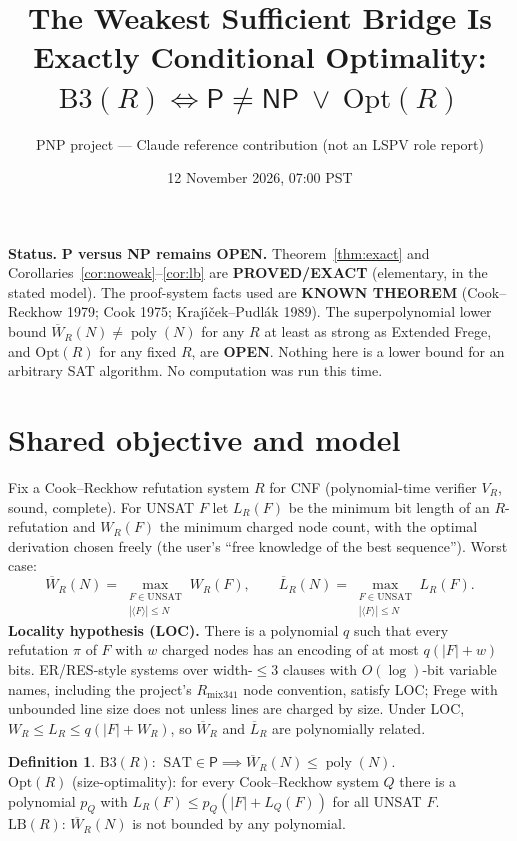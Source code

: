 \documentclass[11pt]{article}
\title{The Weakest Sufficient Bridge Is Exactly Conditional Optimality:\\
$\mathrm{B3}(R)\iff \mathsf P\neq\mathsf{NP}\ \lor\ \mathrm{Opt}(R)$}
\author{PNP project --- Claude reference contribution (not an LSPV role report)}
\date{12 November 2026, 07:00 PST}
\theoremstyle{definition}\newtheorem{definition}[theorem]{Definition}
\newcommand{\poly}{\operatorname{poly}}
\begin{document}
\maketitle

\noindent\textbf{Status.} \textbf{P versus NP remains OPEN.}
Theorem~\ref{thm:exact} and Corollaries~\ref{cor:noweak}--\ref{cor:lb} are
\textbf{PROVED/EXACT} (elementary, in the stated model). The proof-system facts
used are \textbf{KNOWN THEOREM} (Cook--Reckhow 1979; Cook 1975; Kraj\'{\i}\v{c}ek--Pudl\'ak 1989).
The superpolynomial lower bound $\overline W_R(N)\neq\poly(N)$ for any $R$ at least as strong
as Extended Frege, and $\mathrm{Opt}(R)$ for any fixed $R$, are \textbf{OPEN}.
Nothing here is a lower bound for an arbitrary SAT algorithm. No computation was run this time.

\section{Shared objective and model}
Fix a Cook--Reckhow refutation system $R$ for CNF (polynomial-time verifier $V_R$, sound, complete).
For UNSAT $F$ let $L_R(F)$ be the minimum bit length of an $R$-refutation and
$W_R(F)$ the minimum charged node count, with the optimal derivation chosen freely (the user's
``free knowledge of the best sequence''). Worst case:
\[
\overline W_R(N)=\max_{\substack{F\in\mathrm{UNSAT}\\|\langle F\rangle|\le N}} W_R(F),\qquad
\overline L_R(N)=\max_{\substack{F\in\mathrm{UNSAT}\\|\langle F\rangle|\le N}} L_R(F).
\]
\textbf{Locality hypothesis (LOC).} There is a polynomial $q$ such that every refutation $\pi$ of
$F$ with $w$ charged nodes has an encoding of at most $q(|F|+w)$ bits. ER/RES-style
systems over width-$\le 3$ clauses with $O(\log)$-bit variable names, including the project's
$R_{\mathrm{mix341}}$ node convention, satisfy LOC; Frege with unbounded line size does
not unless lines are charged by size. Under LOC, $W_R\le L_R\le q(|F|+W_R)$, so
$\overline W_R$ and $\overline L_R$ are polynomially related.

\begin{definition}
$\mathrm{B3}(R)$: $\ \mathrm{SAT}\in\mathsf P\implies \overline W_R(N)\le\poly(N)$.\\
$\mathrm{Opt}(R)$ (size-optimality): for every Cook--Reckhow system $Q$ there is a polynomial
$p_Q$ with $L_R(F)\le p_Q(|F|+L_Q(F))$ for all UNSAT $F$.\\
$\mathrm{LB}(R)$: $\overline W_R(N)$ is not bounded by any polynomial.
\end{definition}
\end{document}
